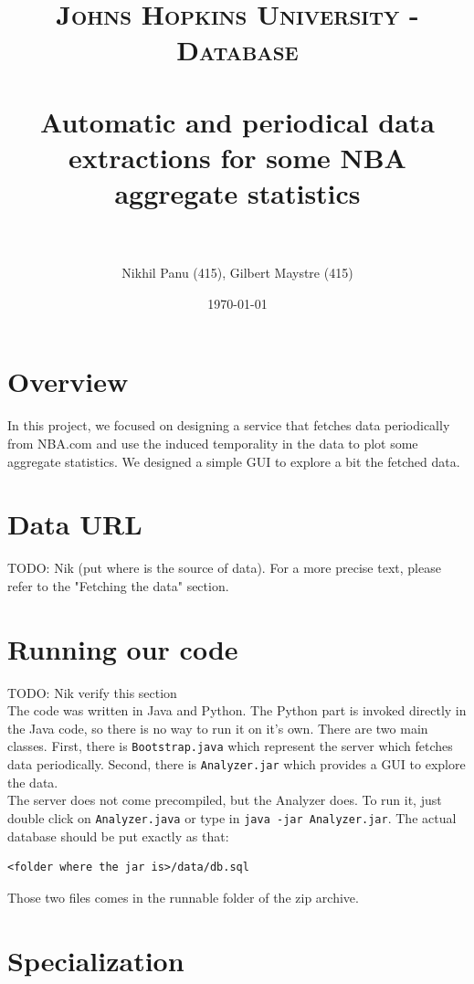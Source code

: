\documentclass[paper=A4, fontsize=11pt]{scrartcl} %
\title{	
\normalfont \normalsize 
\textsc{Johns Hopkins University - Database} \\ [25pt] %
\horrule{0.5pt} \\[0.4cm] %
\huge Automatic and periodical data extractions for some NBA aggregate statistics \\ %
\horrule{2pt} \\[0.5cm] %
}
\author{Nikhil Panu (415), Gilbert Maystre (415)} %
\date{\normalsize\today} %
\begin{document}
\maketitle %
\newpage
\section{Overview}
In this project, we focused on designing a service that fetches data periodically from NBA.com and use the induced temporality in the data to plot some aggregate statistics. We designed a simple GUI to explore a bit the fetched data.

\section{Data URL}

TODO: Nik (put where is the source of data). For a more precise text, please refer to the "Fetching the data" section.

\section{Running our code}
TODO: Nik verify this section\\

The code was written in Java and Python. The Python part is invoked directly in the Java code, so there is no way to run it on it's own. There are two main classes. First, there is \verb!Bootstrap.java! which represent the server which fetches data periodically. Second, there is \verb!Analyzer.jar! which provides a GUI to explore the data.\\

The server does not come precompiled, but the Analyzer does. To run it, just double click on \verb!Analyzer.java! or type in \verb!java -jar Analyzer.jar!. The actual database should be put exactly as that:

\begin{verbatim}
<folder where the jar is>/data/db.sql
\end{verbatim}

Those two files comes in the runnable folder of the zip archive.

\section{Specialization}
\end{document}
